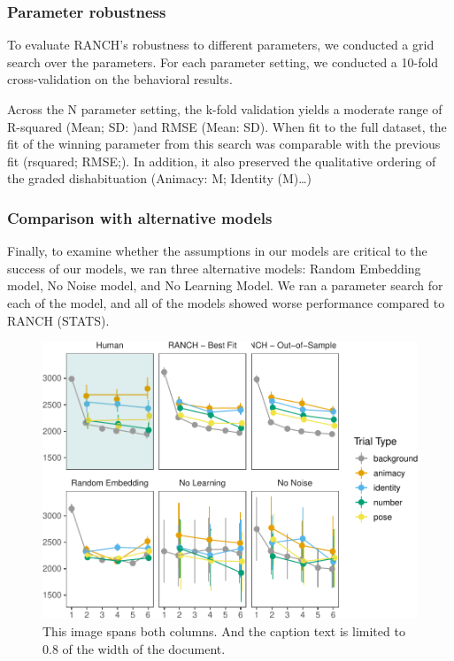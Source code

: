 \documentclass[10pt, letterpaper]{article}
\newenvironment{CodeChunk}{}{}
\begin{document}
\hypertarget{parameter-robustness}{%
\subsubsection{Parameter robustness}\label{parameter-robustness}}

To evaluate RANCH's robustness to different parameters, we conducted a
grid search over the parameters. For each parameter setting, we
conducted a 10-fold cross-validation on the behavioral results.

Across the N parameter setting, the k-fold validation yields a moderate
range of R-squared (Mean; SD: )and RMSE (Mean: SD). When fit to the full
dataset, the fit of the winning parameter from this search was
comparable with the previous fit (rsquared; RMSE;). In addition, it also
preserved the qualitative ordering of the graded dishabituation
(Animacy: M; Identity (M)\ldots)

\hypertarget{comparison-with-alternative-models}{%
\subsubsection{Comparison with alternative
models}\label{comparison-with-alternative-models}}

Finally, to examine whether the assumptions in our models are critical
to the success of our models, we ran three alternative models: Random
Embedding model, No Noise model, and No Learning Model. We ran a
parameter search for each of the model, and all of the models showed
worse performance compared to RANCH (STATS).

\begin{CodeChunk}
\begin{figure}[h]

{\centering \includegraphics{figs/lol-1} 

}

\caption[This image spans both columns]{This image spans both columns. And the caption text is limited to 0.8 of the width of the document.}\label{fig:lol}
\end{figure}
\end{CodeChunk}
\end{document}
